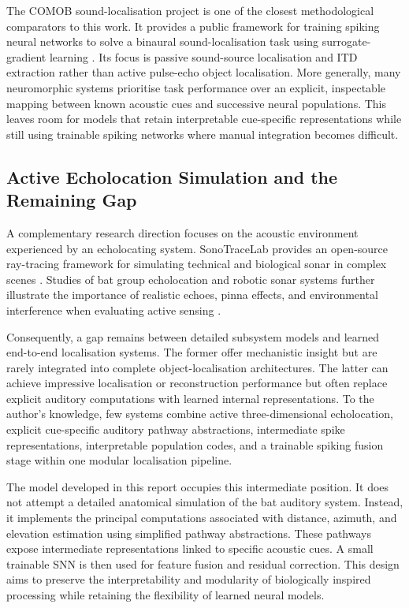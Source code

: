 The COMOB sound-localisation project is one of the closest methodological comparators to this work. It provides a public framework for training spiking neural networks to solve a binaural sound-localisation task using surrogate-gradient learning \cite{SpikingProject}. Its focus is passive sound-source localisation and ITD extraction rather than active pulse-echo object localisation. More generally, many neuromorphic systems prioritise task performance over an explicit, inspectable mapping between known acoustic cues and successive neural populations. This leaves room for models that retain interpretable cue-specific representations while still using trainable spiking networks where manual integration becomes difficult.

\subsection{Active Echolocation Simulation and the Remaining Gap}

A complementary research direction focuses on the acoustic environment experienced by an echolocating system. SonoTraceLab provides an open-source ray-tracing framework for simulating technical and biological sonar in complex scenes \cite{Jansen2024SonoTraceLabBats}. Studies of bat group echolocation and robotic sonar systems further illustrate the importance of realistic echoes, pinna effects, and environmental interference when evaluating active sensing \cite{Mazar2026Agent-basedEmergences,Schillebeeckx2011BiomimeticPinnae}.

Consequently, a gap remains between detailed subsystem models and learned end-to-end localisation systems. The former offer mechanistic insight but are rarely integrated into complete object-localisation architectures. The latter can achieve impressive localisation or reconstruction performance but often replace explicit auditory computations with learned internal representations. To the author's knowledge, few systems combine active three-dimensional echolocation, explicit cue-specific auditory pathway abstractions, intermediate spike representations, interpretable population codes, and a trainable spiking fusion stage within one modular localisation pipeline.

The model developed in this report occupies this intermediate position. It does not attempt a detailed anatomical simulation of the bat auditory system. Instead, it implements the principal computations associated with distance, azimuth, and elevation estimation using simplified pathway abstractions. These pathways expose intermediate representations linked to specific acoustic cues. A small trainable SNN is then used for feature fusion and residual correction. This design aims to preserve the interpretability and modularity of biologically inspired processing while retaining the flexibility of learned neural models.

